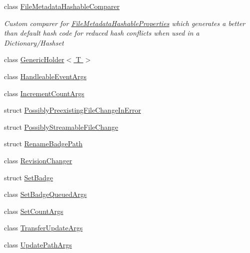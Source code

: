\begin{DoxyCompactItemize}
class \hyperlink{class_cloud_api_public_1_1_model_1_1_file_metadata_hashable_comparer}{File\-Metadata\-Hashable\-Comparer}
\begin{DoxyCompactList}\small\item\em Custom comparer for \hyperlink{struct_cloud_api_public_1_1_model_1_1_file_metadata_hashable_properties}{File\-Metadata\-Hashable\-Properties} which generates a better than default hash code for reduced hash conflicts when used in a Dictionary/\-Hashset \end{DoxyCompactList}\item 
class \hyperlink{class_cloud_api_public_1_1_model_1_1_generic_holder_3_01_t_01_4}{Generic\-Holder$<$ T $>$}
\item 
class \hyperlink{class_cloud_api_public_1_1_model_1_1_handleable_event_args}{Handleable\-Event\-Args}
\item 
class \hyperlink{class_cloud_api_public_1_1_model_1_1_increment_count_args}{Increment\-Count\-Args}
\item 
struct \hyperlink{struct_cloud_api_public_1_1_model_1_1_possibly_preexisting_file_change_in_error}{Possibly\-Preexisting\-File\-Change\-In\-Error}
\item 
struct \hyperlink{struct_cloud_api_public_1_1_model_1_1_possibly_streamable_file_change}{Possibly\-Streamable\-File\-Change}
\item 
struct \hyperlink{struct_cloud_api_public_1_1_model_1_1_rename_badge_path}{Rename\-Badge\-Path}
\item 
class \hyperlink{class_cloud_api_public_1_1_model_1_1_revision_changer}{Revision\-Changer}
\item 
struct \hyperlink{struct_cloud_api_public_1_1_model_1_1_set_badge}{Set\-Badge}
\item 
class \hyperlink{class_cloud_api_public_1_1_model_1_1_set_badge_queued_args}{Set\-Badge\-Queued\-Args}
\item 
class \hyperlink{class_cloud_api_public_1_1_model_1_1_set_count_args}{Set\-Count\-Args}
\item 
class \hyperlink{class_cloud_api_public_1_1_model_1_1_transfer_update_args}{Transfer\-Update\-Args}
\item 
class \hyperlink{class_cloud_api_public_1_1_model_1_1_update_path_args}{Update\-Path\-Args}
\end{DoxyCompactItemize}
